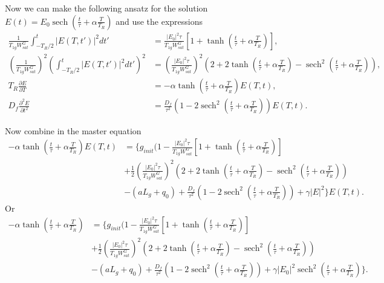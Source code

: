\documentclass[preprint,secnumarabic,amssymb, nobibnotes, aip, prd]{revtex4-1}
\def\p{\partial}
\DeclareMathOperator{\sech}{sech}
\begin{document}
Now we can make the following ansatz for the solution $E(t) = E_0 \sech(\frac{t}{\tau} +\alpha \frac{T}{T_R})$ and use the expressions~\cite{haus1975theoryslow}
\begin{align}
\frac{1}{T_{1g}W_{sat}^G}\int_{-T_R/2}^{t} |E(T,t')|^2dt' &= \frac{|E_0|^2\tau}{T_{1g}W_{sat}^G} [1+\tanh(\frac{t}{\tau}+\alpha \frac{T}{T_R})], \\ 
(\frac{1}{T_{1g}W_{sat}^G})^2\left (\int_{-T_R/2}^{t} |E(T,t')|^2dt' \right)^2 &=  \left(\frac{|E_0|^2\tau}{T_{1g}W_{sat}^G}\right)^2 \left(2+2\tanh(\frac{t}{\tau}+\alpha \frac{T}{T_R}) - \sech^2(\frac{t}{\tau}+\alpha \frac{T}{T_R})\right), \\
T_R\frac{\p E}{\p T} &= -\alpha \tanh(\frac{t}{\tau}+\alpha \frac{T}{T_R}) E(T,t), \\
D_f\frac{\p^2 E}{\p t^2} &= \frac{D_f}{\tau^2}\left( 1-2\sech^2(\frac{t}{\tau}+\alpha \frac{T}{T_R}) \right) E(T,t).
\end{align}

Now combine in the master equation 
\begin{align}
\label{eq:master-equation2}
 -\alpha \tanh(\frac{t}{\tau}+\alpha \frac{T}{T_R}) E(T,t) &=  \{ g_{init}(1 - \frac{|E_0|^2\tau}{T_{1g}W_{sat}^G} [1+\tanh(\frac{t}{\tau}+\alpha \frac{T}{T_R})]  \nonumber \\
 &  +\frac{1}{2} \left(\frac{|E_0|^2\tau}{T_{1g}W_{sat}^G}\right)^2 \left(2+2\tanh(\frac{t}{\tau}+\alpha \frac{T}{T_R}) - \sech^2(\frac{t}{\tau}+\alpha \frac{T}{T_R})\right)  \nonumber \\
 &  -(aL_g+q_0)  + \frac{D_f}{\tau^2}\left( 1-2\sech^2(\frac{t}{\tau}+\alpha \frac{T}{T_R}) \right) + \gamma |E|^2  \}E(T,t).
\end{align}
Or 
\begin{align}
\label{eq:master-equation3}
-\alpha \tanh(\frac{t}{\tau}+\alpha \frac{T}{T_R}) &=  \{ g_{init}(1 - \frac{|E_0|^2\tau}{T_{1g}W_{sat}^G} [1+\tanh(\frac{t}{\tau}+\alpha \frac{T}{T_R})]  \nonumber \\
&  +\frac{1}{2} \left(\frac{|E_0|^2\tau}{T_{1g}W_{sat}^G}\right)^2 \left(2+2\tanh(\frac{t}{\tau}+\alpha \frac{T}{T_R}) - \sech^2(\frac{t}{\tau}+\alpha \frac{T}{T_R})\right)  \nonumber \\
&  -(aL_g+q_0)  + \frac{D_f}{\tau^2}\left( 1-2\sech^2(\frac{t}{\tau}+\alpha \frac{T}{T_R}) \right) + \gamma |E_0|^2\sech^2(\frac{t}{\tau}+\alpha \frac{T}{T_R})  \}.
\end{align}
\end{document}
